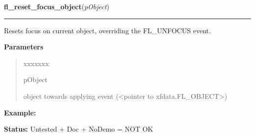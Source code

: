 \hspace{.8\funcindent}\begin{boxedminipage}{\funcwidth}

    \raggedright \textbf{fl\_reset\_focus\_object}(\textit{pObject})

    \vspace{-1.5ex}

    \rule{\textwidth}{0.5\fboxrule}
\setlength{\parskip}{2ex}
    Resets focus on current object, overriding the FL\_UNFOCUS event.

\setlength{\parskip}{1ex}
      \textbf{Parameters}
      \vspace{-1ex}

      \begin{quote}
        \begin{Ventry}{xxxxxxx}

          \item[pObject]

          object towards applying event ({\textless}pointer to 
          xfdata.FL\_OBJECT{\textgreater})

        \end{Ventry}

      \end{quote}

\textbf{Example:} 

\textbf{Status:} Untested + Doc + NoDemo = NOT OK



    \end{boxedminipage}

    \label{xformslib:library:fl_set_form_atclose}

    \vspace{0.5ex}

